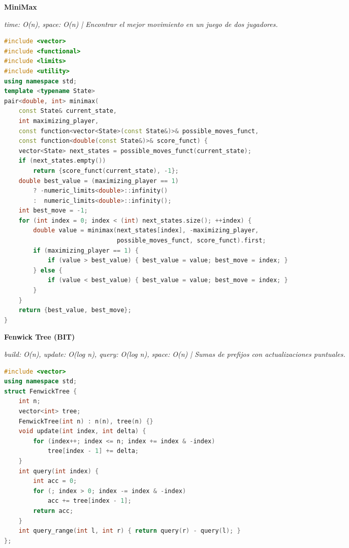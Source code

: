 \documentclass[8pt,a4paper,landscape]{extarticle}
\makeatletter
\newcommand{\csalgo}[1]{%
  \vspace{0.8ex}%
  {\bfseries\small #1}\par
  \vspace{0.4ex}{\color{cs@rule}\hrule height 0.4pt}\vspace{0.5ex}%
}
\newcommand{\csstats}[1]{{\scriptsize\itshape #1\par\vspace{0.3ex}}}
\makeatother
\begin{document}
\begin{multicols}{3}
\csalgo{MiniMax}
\csstats{time: O(n), space: O(n)  |  Encontrar el mejor movimiento en un juego de dos jugadores.}
\begin{lstlisting}[language=C++]
#include <vector>
#include <functional>
#include <limits>
#include <utility>
using namespace std;
template <typename State>
pair<double, int> minimax(
    const State& current_state,
    int maximizing_player,
    const function<vector<State>(const State&)>& possible_moves_funct,
    const function<double(const State&)>& score_funct) {
    vector<State> next_states = possible_moves_funct(current_state);
    if (next_states.empty())
        return {score_funct(current_state), -1};
    double best_value = (maximizing_player == 1)
        ? -numeric_limits<double>::infinity()
        :  numeric_limits<double>::infinity();
    int best_move = -1;
    for (int index = 0; index < (int) next_states.size(); ++index) {
        double value = minimax(next_states[index], -maximizing_player,
                               possible_moves_funct, score_funct).first;
        if (maximizing_player == 1) {
            if (value > best_value) { best_value = value; best_move = index; }
        } else {
            if (value < best_value) { best_value = value; best_move = index; }
        }
    }
    return {best_value, best_move};
}
\end{lstlisting}

\csalgo{Fenwick Tree (BIT)}
\csstats{build: O(n), update: O(log n), query: O(log n), space: O(n)  |  Sumas de prefijos con actualizaciones puntuales.}
\begin{lstlisting}[language=C++]
#include <vector>
using namespace std;
struct FenwickTree {
    int n;
    vector<int> tree;
    FenwickTree(int n) : n(n), tree(n) {}
    void update(int index, int delta) {
        for (index++; index <= n; index += index & -index)
            tree[index - 1] += delta;
    }
    int query(int index) {
        int acc = 0;
        for (; index > 0; index -= index & -index)
            acc += tree[index - 1];
        return acc;
    }
    int query_range(int l, int r) { return query(r) - query(l); }
};
\end{lstlisting}


\end{multicols}
\end{document}
